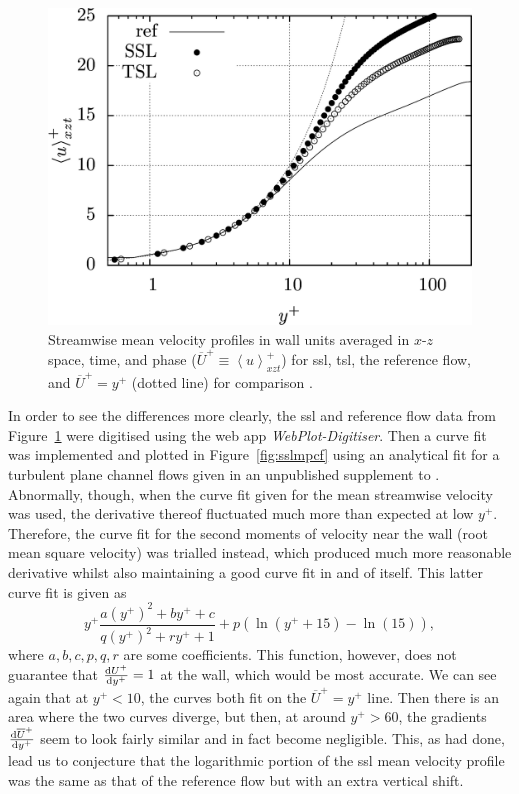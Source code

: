\begin{figure}[htbp]
	\centering
	\includegraphics[width=0.7\linewidth]{project/fig/sslmeanprofile.png}
	\caption[Streamwise mean velocity profiles of SSL and reference flow]{Streamwise mean velocity profiles in wall units averaged in $x$-$z$ space, time, and phase ($\overline{U}^{+}\equiv \left<u \right>^{+}_{xzt}$) for \gls*{ssl}, \gls*{tsl}, the reference flow, and $\overline{U}^{+}=y^{+}$ (dotted line) for comparison \cite{viotti2009}.}
	\label{fig:sslmeanprofile}
\end{figure}

In order to see the differences more clearly, the  \gls*{ssl} and reference flow data from Figure~\ref{fig:sslmeanprofile} were digitised using the web app \textit{WebPlot-Digitiser}. Then a curve fit was implemented and plotted in Figure~\ref{fig:sslmpcf} using an analytical fit for a turbulent plane channel flows given in an unpublished supplement to \cite{chernyshenko2021}. Abnormally, though, when the curve fit given for the mean streamwise velocity was used, the derivative thereof fluctuated much more than expected at low $y^{+}$. Therefore, the curve fit for the second moments of velocity near the wall (root mean square velocity) was trialled instead, which produced much more reasonable derivative whilst also maintaining a good curve fit in and of itself. This latter curve fit is given as
\begin{equation}
	y^{+}  \frac{a\left(y^{+}\right)^2 + by^{+} + c}{q\left(y^{+}\right)^2 + ry^{+} + 1} + p \left( \ln(y^{+}+15)-\ln(15)\right)\label{eq:curvefit}
,\end{equation}
where $a,b,c,p,q,r$ are some coefficients. This function, however, does not guarantee that $\dv{U^{+}}{y^{+}} =1$ at the wall, which would be most accurate. We can see again that at $y^{+}<10$, the curves both fit on the $\overline{U}^{+}=y^{+}$ line. Then there is an area where the two curves diverge, but then, at around $y^{+}>60$, the gradients $\dv{\overline{U}^{+}}{y^{+}} $ seem to look fairly similar and in fact become negligible. This, as \textcite{viotti2009} had done, lead us to conjecture that the logarithmic portion of the \gls*{ssl} mean velocity profile was the same as that of the reference flow but with an extra vertical shift.

